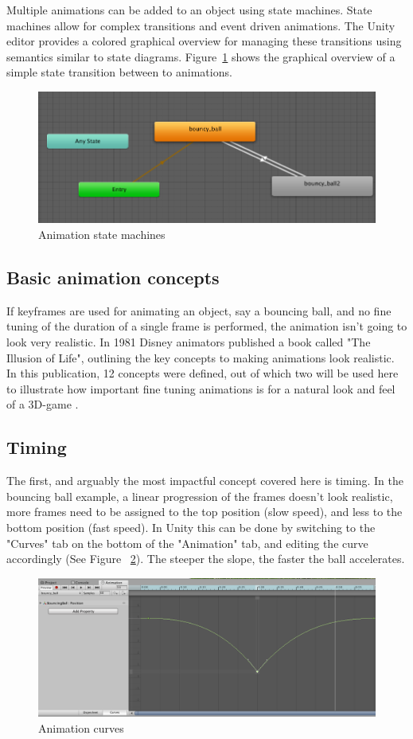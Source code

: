 \documentclass[conference]{IEEEtran}
\begin{document}
Multiple animations can be added to an object using state machines. State machines allow for complex transitions and event driven animations. The Unity editor provides a colored graphical overview for managing these transitions using semantics similar to state diagrams. Figure~\ref{fig:adding_animations_state_machines} shows the graphical overview of a simple state transition between to animations.
\begin{figure}[htbp]
  \includegraphics[width=.4\textwidth]{pictures/animation_states}
  \caption{Animation state machines}
  \label{fig:adding_animations_state_machines}
\end{figure}

\subsection{Basic animation concepts}

If keyframes are used for animating an object, say a bouncing ball, and no fine tuning of the duration of a single frame is performed, the animation isn't going to look very realistic. In 1981 Disney animators published a book called "The Illusion of Life", outlining the key concepts to making animations look realistic. In this publication, 12 concepts were defined, out of which two will be used here to illustrate how important fine tuning animations is for a natural look and feel of a 3D-game \cite{b3}.

\subsection{Timing}

The first, and arguably the most impactful concept covered here is timing. In the bouncing ball example, a linear progression of the frames doesn't look realistic, more frames need to be assigned to the top position (slow speed), and less to the bottom position (fast speed). In Unity this can be done by switching to the "Curves" tab on the bottom of the "Animation" tab, and editing the curve accordingly (See Figure ~\ref{fig:adding_animations_curves}). The steeper the slope, the faster the ball accelerates.

\begin{figure}[htbp]
  \includegraphics[width=.4\textwidth]{pictures/animation_curves}
  \caption{Animation curves}
  \label{fig:adding_animations_curves}
\end{figure}
\end{document}
